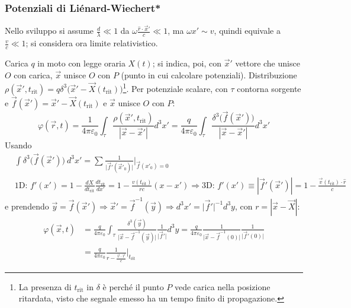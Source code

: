 \documentclass[10pt, a4paper]{scrartcl}
\numberwithin{equation}{subsection}
\theoremstyle{style1}
\begin{document}
\subsubsection{Potenziali di Li\'enard-Wiechert*}
Nello sviluppo si assume $\frac{d}{\lambda }\ll 1 $ da $\omega\frac{\hat{r}\cdot \vec{x}'}{c}\ll 1$, ma $\omega x' \sim v$, quindi equivale a $\frac{v}{c}\ll 1$; si considera ora limite relativistico.

Carica $q$ in moto con legge oraria $X(t)$; si indica, poi, con $\vec{x}'$ vettore che unisce $O$ con carica, $\vec{x}$ unisce $O$ con $P$ (punto in cui calcolare potenziali). Distribuzione $\rho (\vec{x}', t_\text{rit}) = q\delta ^3 \big(\vec{x}' - \vec{X}(t_{\text{rit}}) \big)$\footnote{La presenza di $t_\text{rit}$ in $\delta $ è perch\'e il punto $P$ vede carica nella posizione ritardata, visto che segnale emesso ha un tempo finito di propagazione.}. Per potenziale scalare, con $\tau $ contorna sorgente e $\vec{f}(\vec{x}') = \vec{x}' - \vec{X}(t_\text{rit})$ e $\vec{x}$ unisce $O$ con $P$:
\[
\varphi (\vec{r},t) = \frac{1}{4\pi \varepsilon _0} \int_\tau \frac{\rho (\vec{x}', t_\text{rit})}{\left\lvert \vec{x}-\vec{x}' \right\rvert }d^3 x' = \frac{q}{4\pi \varepsilon _0}\int_{\tau } \frac{\delta ^3 \big(\vec{f}(\vec{x}')\big)}{\left\lvert \vec{x}-\vec{x}' \right\rvert } d^3 x'
\] 
Usando
\[
\begin{split}
	&\int \delta ^3 \big(\vec{f}(\vec{x}')\big) \ d^3 x' = \sum_{}^{} \frac{1}{\lvert \vec{f}' (\vec{x}'_0)\rvert }\Bigg|_{\vec{f}(x'_0) = 0} \\
	&\text{1D: } f'(x') = 1-\frac{d X}{d t_\text{rit}} \frac{d t_\text{rit}}{d x'} = 1-\frac{v(t_\text{rit})}{rc}(x-x')\Rightarrow \text{3D: } f'(x')\equiv | \vec{f}'(\vec{x}')| = 1- \frac{\vec{v}(t_\text{rit})\cdot \hat{r}}{c}
\end{split}
\] 
e prendendo $\vec{y}=\vec{f}(\vec{x}')\Rightarrow \vec{x}' = \vec{f}^{-1} (\vec{y})\Rightarrow d^3 x' = \lvert \vec{f}' \rvert ^{-1}d^3y $, con $r = |\vec{x}-\vec{X}|$:
\begin{equation}
	\begin{split}
		\varphi (\vec{x},t) &= \frac{q}{4\pi \varepsilon _0} \int_{\tau } \frac{\delta ^3(\vec{y})}{\lvert \vec{x}-\vec{f}^{-1} (\vec{y}) \rvert } \frac{1}{\lvert \vec{f}' \rvert }d^3y = \frac{q}{4\pi \varepsilon _0} \frac{1}{ \lvert\vec{x}- \vec{f}^{-1} (0) \rvert} \frac{1}{\lvert\vec{f}'(0)\rvert}\\
				    &=\frac{q}{4\pi \varepsilon _0}\frac{1}{r- \frac{\vec{v}\cdot \vec{r}}{c}}\Bigg|_{t_\text{rit}} 
	\end{split}
\end{equation}
\end{document}
